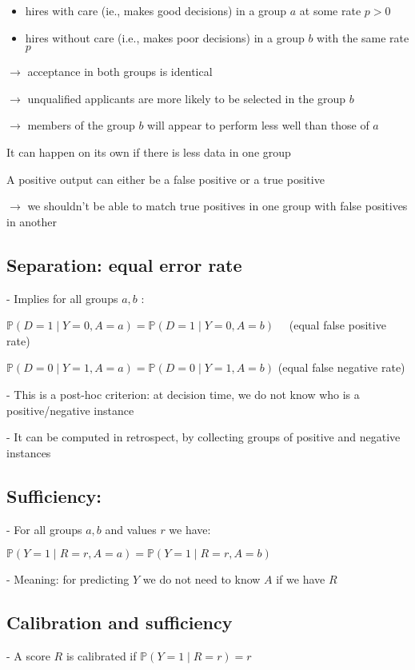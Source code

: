 \begin{itemize}
  \item hires with care (ie., makes good decisions) in a group $a$ at some rate $p>0$
  \item hires without care (i.e., makes poor decisions) in a group $b$ with the same rate $p$
\end{itemize}

$\rightarrow$ acceptance in both groups is identical

$\rightarrow$ unqualified applicants are more likely to be selected in the group $b$

$\rightarrow$ members of the group $b$ will appear to perform less well than those of $a$

It can happen on its own if there is less data in one group

A positive output can either be a false positive or a true positive

$\rightarrow$ we shouldn't be able to match true positives in one group with false positives in another

\subsection*{Separation: equal error rate}

- Implies for all groups $a, b$ :

$\mathbb{P}(D=1 \mid Y=0, A=a)=\mathbb{P}(D=1 \mid Y=0, A=b) \quad$ (equal false positive rate)

$\mathbb{P}(D=0 \mid Y=1, A=a)=\mathbb{P}(D=0 \mid Y=1, A=b)$ (equal false negative rate)

- This is a post-hoc criterion: at decision time, we do not know who is a positive/negative instance

- It can be computed in retrospect, by collecting groups of positive and negative instances

\subsection*{Sufficiency:}

- For all groups $a, b$ and values $r$ we have:

$
\mathbb{P}(Y=1 \mid R=r, A=a)=\mathbb{P}(Y=1 \mid R=r, A=b)
$

- Meaning: for predicting $Y$ we do not need to know $A$ if we have $R$

\subsection*{Calibration and sufficiency}
- A score $R$ is calibrated if $
\mathbb{P}(Y=1 \mid R=r)=r
$

